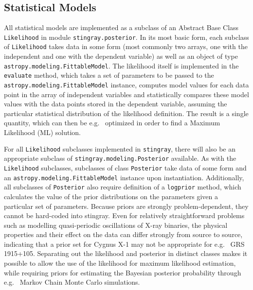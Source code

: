 \documentclass[twocolumn]{aastex62}
\newcommand{\stingray}{\texttt{stingray}\xspace}
\newcommand{\likelihood}{\texttt{Likelihood}\xspace}
\begin{document}
\subsection{Statistical Models}

All statistical models are implemented as a subclass of an Abstract Base Class \likelihood in module \verb|stingray.posterior|. In its most basic form, each subclass of \likelihood takes data in some form (most commonly two arrays, one with the independent and one with the dependent variable) as well as an object of type \verb|astropy.modeling.FittableModel|. The likelihood itself is implemented in the \texttt{evaluate} method, which takes a set of parameters to be passed to the \verb|astropy.modeling.FittableModel| instance, computes model values for each data point in the array of independent variables and statistically compares these model values with the data points stored in the dependent variable, assuming the particular statistical distribution of the likelihood definition. The result is a single quantity, which can then be e.g.~ optimized in order to find a Maximum Likelihood (ML) solution.

For all \likelihood subclasses implemented in \stingray, there will also be an appropriate subclass of \verb|stingray.modeling.Posterior| available. As with the \likelihood subclasses, subclasses of class \verb|Posterior| take data of some form and an \verb|astropy.modeling.FittableModel| instance upon instantiation. Additionally, all subclasses of  \verb|Posterior| also require definition of a \texttt{logprior} method, which calculates the value of the prior distributions on the parameters given a particular set of parameters. Because priors are strongly problem-dependent, they cannot be hard-coded into stingray. Even for relatively straightforward problems such as modelling quasi-periodic oscillations of X-ray binaries, the physical properties and their effect on the data can differ strongly from source to source, indicating that a prior set for Cygnus X-1 may not be appropriate for e.g.~ GRS 1915+105. Separating out the likelihood and posterior in distinct classes makes it possible to allow the use of the likelihood for maximum likelihood estimation, while requiring priors for estimating the Bayesian posterior probability through e.g.~ Markov Chain Monte Carlo simulations.
\end{document}
